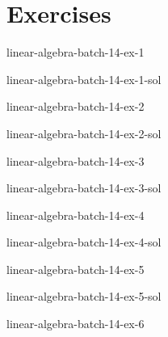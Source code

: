 \documentclass[preview]{standalone}
\begin{document}
\genpage

\section{Exercises}

\begin{snippetexercise}{linear-algebra-batch-14-ex-1}{}
    \todo
\end{snippetexercise}

\begin{snippetsolution}{linear-algebra-batch-14-ex-1-sol}{}
    \todo
\end{snippetsolution}

\begin{snippetexercise}{linear-algebra-batch-14-ex-2}{}
    \todo
\end{snippetexercise}

\begin{snippetsolution}{linear-algebra-batch-14-ex-2-sol}{}
    \todo
\end{snippetsolution}

\begin{snippetexercise}{linear-algebra-batch-14-ex-3}{}
    \todo
\end{snippetexercise}

\begin{snippetsolution}{linear-algebra-batch-14-ex-3-sol}{}
    \todo
\end{snippetsolution}

\begin{snippetexercise}{linear-algebra-batch-14-ex-4}{}
    \todo
\end{snippetexercise}

\begin{snippetsolution}{linear-algebra-batch-14-ex-4-sol}{}
    \todo
\end{snippetsolution}

\begin{snippetexercise}{linear-algebra-batch-14-ex-5}{}
    \todo
\end{snippetexercise}

\begin{snippetsolution}{linear-algebra-batch-14-ex-5-sol}{}
    \todo
\end{snippetsolution}

\begin{snippetexercise}{linear-algebra-batch-14-ex-6}{}
    \todo
\end{snippetexercise}
\end{document}
